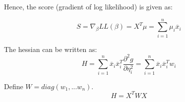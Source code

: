 \documentclass[12pt,a4paper]{report}
\begin{document}
Hence, the score (gradient of log likelihood) is given as:

\begin{equation}
S = \nabla_{\beta} LL(\beta) = X^T \mu = \sum_{i=1}^n \mu_i \overline x_i
\end{equation}




%
%
%
%

The hessian can be written as:
\begin{equation} \label{w_i}
H = \sum_{i=1}^n  \overline x_i \overline x_i^T \frac{\partial^2 g}{\partial \eta_i^2}
 = \sum_{i=1}^n  \overline x_i \overline x_i^T w_i
\end{equation}


Define $W=diag(w_1, ... w_n)$.
\begin{equation}
H = X^T W X
\end{equation}


\end{document}
